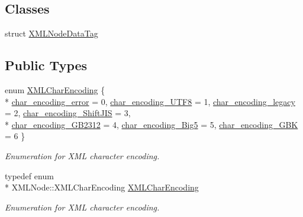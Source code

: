 \subsection*{Classes}
\begin{DoxyCompactItemize}
\item 
struct \hyperlink{structXMLNode_1_1XMLNodeDataTag}{X\-M\-L\-Node\-Data\-Tag}
\end{DoxyCompactItemize}
\subsection*{Public Types}
\begin{DoxyCompactItemize}
\item 
enum \hyperlink{structXMLNode_a81bcd09f9c752b65633c1ca28ea025f2}{X\-M\-L\-Char\-Encoding} \{ \\*
\hyperlink{structXMLNode_a81bcd09f9c752b65633c1ca28ea025f2a901e3af8a5e1308d1a198398c2b3da76}{char\-\_\-encoding\-\_\-error} = 0, 
\hyperlink{structXMLNode_a81bcd09f9c752b65633c1ca28ea025f2a0b35b4d55aae2d232400578ab1123d5a}{char\-\_\-encoding\-\_\-\-U\-T\-F8} = 1, 
\hyperlink{structXMLNode_a81bcd09f9c752b65633c1ca28ea025f2afcce4646efba5d15cc00d958a075c1ed}{char\-\_\-encoding\-\_\-legacy} = 2, 
\hyperlink{structXMLNode_a81bcd09f9c752b65633c1ca28ea025f2afa21f31e866cedff460f7e907d2339cc}{char\-\_\-encoding\-\_\-\-Shift\-J\-I\-S} = 3, 
\\*
\hyperlink{structXMLNode_a81bcd09f9c752b65633c1ca28ea025f2a6f2ed679397fa246d1e5062371ba3776}{char\-\_\-encoding\-\_\-\-G\-B2312} = 4, 
\hyperlink{structXMLNode_a81bcd09f9c752b65633c1ca28ea025f2abf8658aa97c3bcb0d714cce6bb77a0b8}{char\-\_\-encoding\-\_\-\-Big5} = 5, 
\hyperlink{structXMLNode_a81bcd09f9c752b65633c1ca28ea025f2a5f55b2ae64719235ea4ea4aae651264c}{char\-\_\-encoding\-\_\-\-G\-B\-K} = 6
 \}
\begin{DoxyCompactList}\small\item\em Enumeration for X\-M\-L character encoding. \end{DoxyCompactList}\item 
typedef enum \\*
X\-M\-L\-Node\-::\-X\-M\-L\-Char\-Encoding \hyperlink{structXMLNode_a81cfd85cde37d43408069f45205e3c8d}{X\-M\-L\-Char\-Encoding}
\begin{DoxyCompactList}\small\item\em Enumeration for X\-M\-L character encoding. \end{DoxyCompactList}\end{DoxyCompactItemize}
